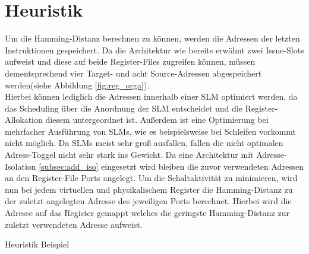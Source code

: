 \section{Heuristik}
\label{sec:Heuristik}

Um die Hamming-Distanz berechnen zu können, werden die Adressen der letzten Instruktionen gespeichert. Da die Architektur wie bereits erwähnt zwei Issue-Slots aufweist und diese auf beide Register-Files zugreifen können, müssen dementsprechend vier Target- und acht Source-Adressen abgespeichert werden(siehe Abbildung \ref{fig:reg_orga}).\\
Hierbei können lediglich die Adressen innerhalb einer SLM optimiert werden, da das Scheduling über die Anordnung der SLM entscheidet und die Register-Allokation diesem untergeordnet ist. Außerdem ist eine Optimierung bei mehrfacher Ausführung von SLMs, wie es beispielsweise bei Schleifen vorkommt nicht möglich. Da SLMs meist sehr groß ausfallen, fallen die nicht optimalen Adress-Toggel nicht sehr stark ins Gewicht.
Da eine Architektur mit Adresse-Isolation \ref{subsec:add_iso} eingesetzt wird bleiben die zuvor verwendeten Adressen an den Register-File Ports angelegt. Um die Schaltaktivität zu minimieren, wird nun bei jedem virtuellen und physikalischem Register die Hamming-Distanz zu der zuletzt angelegten Adresse des jeweiligen Ports berechnet. Hierbei wird die Adresse auf das Register gemappt welches die geringste Hamming-Distanz zur zuletzt verwendeten Adresse aufweist.\\

\begin{algorithm}[H]
	\begin{algorithmic}[1]
		\caption{Heuristik Beispiel}
		\label{code:heuristik}
\end{algorithmic}
\end{algorithm}

